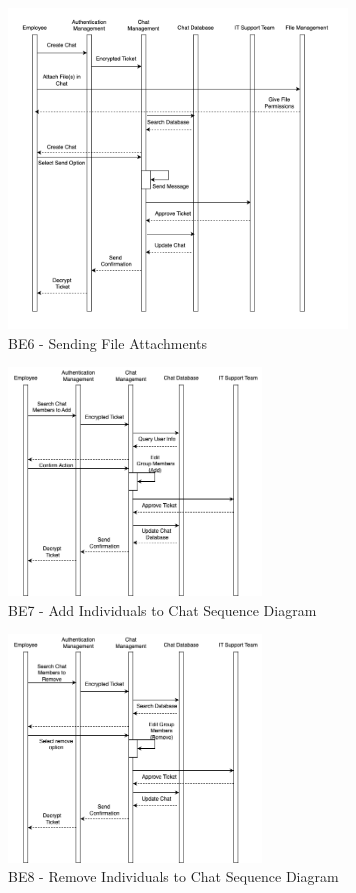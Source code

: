 \documentclass[]{article}
\begin{document}
\begin{figure}[H]
    \centering
    \includegraphics[width=9cm]{BE6.png}
    \caption{BE6 - Sending File Attachments}
    \label{fig:galaxy}
\end{figure}

\begin{figure}[H]
	\centering
	\includegraphics[width=0.6\textwidth]{BE7.png}
	\caption{BE7 - Add Individuals to Chat Sequence Diagram}
\end{figure}

\begin{figure}[H]
	\centering
	\includegraphics[width=0.6\textwidth]{BE8.png}
	\caption{BE8 - Remove Individuals to Chat Sequence Diagram}
\end{figure}
\end{document}
